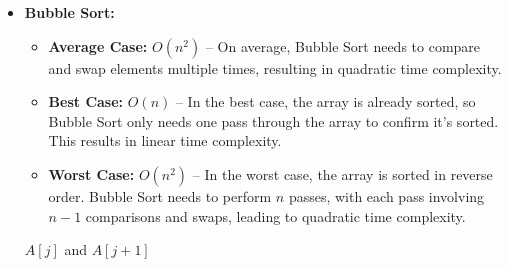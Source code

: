 \documentclass[12pt]{book} %
\begin{document}
\begin{itemize}
    \item \textbf{Bubble Sort:}
        \begin{itemize}
            \item \textbf{Average Case:} $O(n^2)$ – On average, Bubble Sort needs to compare and swap elements multiple times, resulting in quadratic time complexity.
            \item \textbf{Best Case:} $O(n)$ – In the best case, the array is already sorted, so Bubble Sort only needs one pass through the array to confirm it's sorted. This results in linear time complexity.
            \item \textbf{Worst Case:} $O(n^2)$ – In the worst case, the array is sorted in reverse order. Bubble Sort needs to perform $n$ passes, with each pass involving $n-1$ comparisons and swaps, leading to quadratic time complexity.
        \end{itemize}
        \begin{algorithm}
            \caption{Bubble Sort}
            \begin{algorithmic}[1]
                                \State {} $A[j]$ and $A[j+1]$
                            \EndIf
                        \EndFor
                    \EndFor
                    \EndProcedure
                \end{algorithmic}
            \end{algorithm}
\end{itemize}
\end{document}
